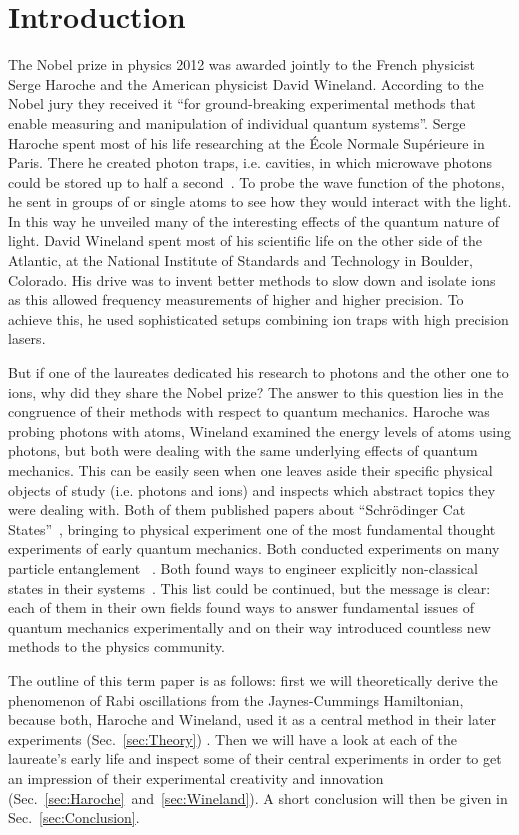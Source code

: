 \section{Introduction}
The Nobel prize in physics 2012 was awarded jointly to the French physicist
Serge Haroche and the American physicist David Wineland.
According to the Nobel jury they received it ``for ground-breaking experimental
methods that enable measuring and manipulation of individual quantum systems''.
Serge Haroche spent most of his life researching at the École Normale Supérieure
in Paris. There he created photon traps, i.e. cavities, in which microwave
photons could be stored up to half a second~\cite{haroche2007QuantumJumps}. To
probe the wave function of the photons, he sent in groups of or single atoms to
see how they would interact with the light. In this way he unveiled many of the
interesting effects of the quantum nature of light. David Wineland spent most of
his scientific life on the other side of the Atlantic, at the National Institute
of Standards and Technology in Boulder, Colorado. His drive was to invent better
methods to slow down and
isolate ions as this allowed frequency measurements of
higher and higher precision. To achieve this, he used sophisticated setups
combining ion traps with high precision lasers. 

But if one of the laureates dedicated his research to photons and the other one
to ions, why did they share the Nobel prize? The answer to this question lies in
the congruence of their methods with respect to quantum mechanics. Haroche was
probing photons with atoms, Wineland examined the energy levels of atoms using
photons, but both were dealing with the same underlying effects of quantum
mechanics. This can be easily seen when one leaves aside their specific physical
objects of study (i.e. photons and ions) and inspects which abstract topics
they were dealing with. Both of them published papers about ``Schrödinger Cat
States''~\cite{brune1992manipulation, monroe1996schrodinger}, bringing to
physical experiment one of the most fundamental thought experiments of early
quantum mechanics. Both conducted experiments on many particle entanglement
~\cite{rauschenbeutel2000step, sackett2000experimental}. Both found ways to
engineer explicitly  non-classical states in their systems~\cite{meekhof1996generation,
deleglise2008reconstruction}. This list could be continued, but the message is
clear: each of them in their own fields found ways to answer fundamental issues
of quantum mechanics experimentally and on their way introduced countless new
methods to the physics community.

The outline of this term paper is as follows: first we will theoretically derive
the phenomenon of Rabi oscillations from the Jaynes-Cummings Hamiltonian, because
both, Haroche and Wineland, used it as a central method in their later
experiments (Sec.~\ref{sec:Theory}) . Then we will have a look at  each of the
laureate's early life and inspect some of their central experiments in order to
get an impression of their experimental creativity and innovation
(Sec.~\ref{sec:Haroche}~and~\ref{sec:Wineland}). A short conclusion will then be
given in Sec.~\ref{sec:Conclusion}.
